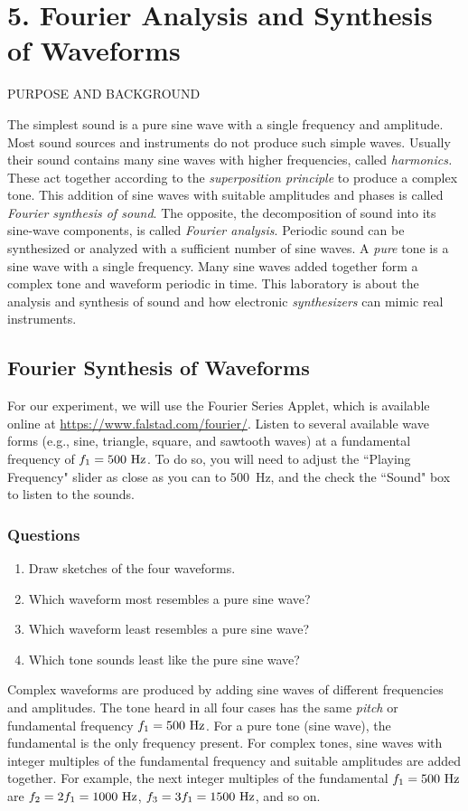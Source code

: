 \documentclass[11pt]{NSF}
\def\ben{\begin{enumerate}}
\def\een{\end{enumerate}}
\def\i{\item{}}
\begin{document}
     
\section{5. Fourier Analysis and Synthesis of Waveforms}

PURPOSE AND BACKGROUND

The simplest sound is a pure sine wave with a single frequency and amplitude.
Most sound sources and instruments do not produce such simple waves. Usually
their sound contains many sine waves with higher frequencies, called {\em harmonics.}
These act together according to the {\em superposition principle} to produce a
complex tone. This addition of sine waves with suitable amplitudes and phases
is called {\em Fourier synthesis of sound}. 
The opposite, the decomposition of sound
into its sine-wave components, is called {\em Fourier analysis}. 
Periodic sound can
be synthesized or analyzed with a sufficient number of sine waves. 
A {\em pure} tone is a sine wave with a single frequency. 
Many sine waves added together form a
complex tone and waveform periodic in time. This laboratory is about the
analysis and synthesis of sound and how electronic 
{\em synthesizers} can mimic real instruments.

\subsection{Fourier Synthesis of Waveforms}

For our experiment, we will use the 
Fourier Series Applet, which is available online at 
\url{https://www.falstad.com/fourier/}.
Listen to several available wave forms (e.g.,  sine, triangle, 
square, and sawtooth waves) at a fundamental frequency of 
$f_1 = 500~{\rm Hz}$.
To do so, you will need to adjust the ``Playing Frequency" 
slider as close as you can to 500~Hz,  
and the check the ``Sound" box to listen to the sounds.

\subsubsection*{Questions}
\ben
\i Draw sketches of the four waveforms.

\i Which waveform most resembles a pure sine wave?

\i Which waveform least resembles a pure sine wave?

\i Which tone sounds least like the pure sine wave?
\een

Complex waveforms are produced by adding sine waves of different frequencies
and amplitudes. The tone heard in all four cases has the same {\em pitch} or
fundamental frequency $f_1= 500~{\rm Hz}$. For a pure tone (sine wave), the fundamental
is the only frequency present. For complex tones, sine waves with integer
multiples of the fundamental frequency and suitable amplitudes are added
together. For example, the next integer multiples of the fundamental 
$f_1 = 500~{\rm Hz}$ are 
$f_2 = 2 f_1= 1000~{\rm Hz}$, 
$f_3 = 3 f_1 = 1500~{\rm Hz}$, and so on.
\end{document}
